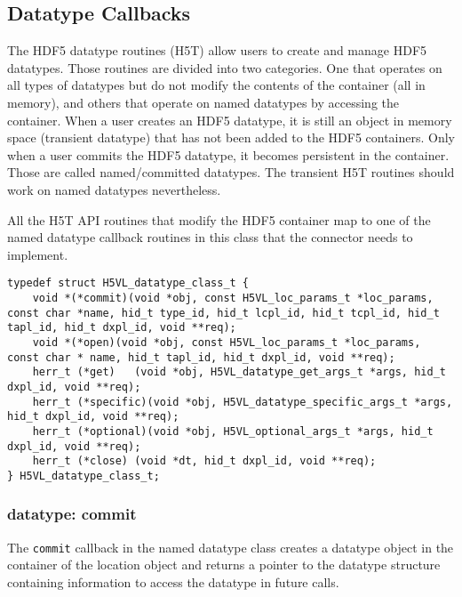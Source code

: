 
\subsection{Datatype Callbacks}
The HDF5 datatype routines (H5T) allow users to create and manage HDF5
datatypes. Those routines are divided into two categories. One that
operates on all types of datatypes but do not modify the contents of
the container (all in memory), and others that operate on named
datatypes by accessing the container. When a user creates an HDF5
datatype, it is still an object in memory space (transient datatype)
that has not been added to the HDF5 containers. Only when a user
commits the HDF5 datatype, it becomes persistent in the
container. Those are called named/committed datatypes. The transient
H5T routines should work on named datatypes nevertheless. 

All the H5T API routines that modify the HDF5 container map to one of
the named datatype callback routines in this class that the connector needs to
implement.

\begin{lstlisting}[caption={Structure for datatype callback routines, H5VLconnector.h}, captionpos=b, label={lst:H5Tclass}]
typedef struct H5VL_datatype_class_t {                                           
    void *(*commit)(void *obj, const H5VL_loc_params_t *loc_params, const char *name, hid_t type_id, hid_t lcpl_id, hid_t tcpl_id, hid_t tapl_id, hid_t dxpl_id, void **req);
    void *(*open)(void *obj, const H5VL_loc_params_t *loc_params, const char * name, hid_t tapl_id, hid_t dxpl_id, void **req);
    herr_t (*get)   (void *obj, H5VL_datatype_get_args_t *args, hid_t dxpl_id, void **req);
    herr_t (*specific)(void *obj, H5VL_datatype_specific_args_t *args, hid_t dxpl_id, void **req);            
    herr_t (*optional)(void *obj, H5VL_optional_args_t *args, hid_t dxpl_id, void **req); 
    herr_t (*close) (void *dt, hid_t dxpl_id, void **req);                       
} H5VL_datatype_class_t; 
\end{lstlisting}

\subsubsection{datatype: commit}
The \texttt{commit} callback in the named datatype class creates a datatype object in the container of the location object and
returns a pointer to the datatype structure containing information to access the datatype in future calls.\bigskip

